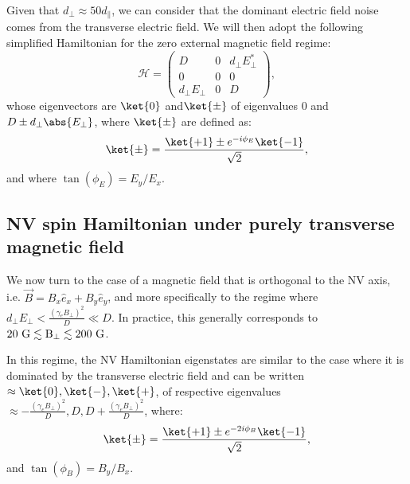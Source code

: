 \documentclass[a4paper, 11pt]{report}
\begin{document}
Given that $d_\perp \approx 50 d_\parallel$, we can consider that the dominant electric field noise comes from the transverse electric field. We will then adopt the following simplified Hamiltonian for the zero external magnetic field regime:
\begin{equation}
\mathcal{H}=\begin{pmatrix}
D&0&d_\perp E_\perp^* \\
0&0&0 \\
d_\perp E_\perp &0&D
\end{pmatrix},
\end{equation}
whose eigenvectors are $\ket{0}$ and$\ket{\pm}$ of eigenvalues 0 and $D\pm d_\perp \abs{E_\perp}$, where $\ket{\pm}$ are defined as:
\begin{equation}
\ket{\pm}=\frac{\ket{+1}\pm e^{-i\phi_E}\ket{-1}}{\sqrt{2}},
\end{equation}
and where $\tan(\phi_E)=E_y/E_x$.

\subsection{NV spin Hamiltonian under purely transverse magnetic field}
\label{sec B transverse}

We now turn to the case of a magnetic field that is orthogonal to the NV axis, i.e. $\vec{B}=B_x \hat{e}_x + B_y \hat e_y$, and more specifically to the regime where $d_\perp E_\perp < \frac{(\gamma_e B_\perp)^2}{D} \ll D$. In practice, this generally corresponds to $20\ \rm G \lesssim B_\perp \lesssim 200\ \rm G$.

In this regime, the NV Hamiltonian eigenstates are similar to the case where it is dominated by the transverse electric field and can be written $\approx \ket{0}, \ket{-}, \ket{+}$\citep{qiu2021nuclear, qiu2022nanoscale}, of respective eigenvalues $\approx -\frac{(\gamma_e B_\perp)^2}{D},D,D+\frac{(\gamma_e B_\perp)^2}{D}$, where:
\begin{equation}
\ket{\pm}=\frac{\ket{+1}\pm e^{-2i\phi_B}\ket{-1}}{\sqrt{2}},
\end{equation}
and $\tan(\phi_B)=B_y/B_x$.
\end{document}
